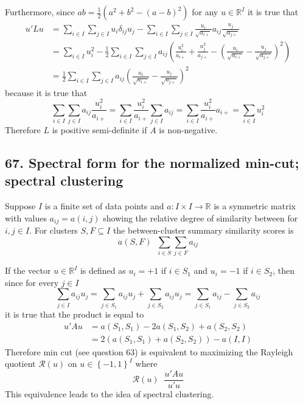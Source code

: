 \documentclass[a4paper]{article}
\newcommand{\obj}[1]{{\left\{ #1 \right \}}}
\newcommand{\brac}[1]{{\left ( #1 \right )}}
\newcommand{\Real}{\mathbb{R}}
\newcommand{\defn}{\mathop{\overset{\Delta}{=}}\nolimits}
\begin{document}
Furthermore, since $ab = \tfrac{1}{2}\brac{a^2 + b^2 - \brac{a-b}^2}$ for any $u\in \Real^I$ it is true that \begin{align*}
	u'Lu &= \sum_{i\in I} \sum_{j\in I} u_i \delta_{ij} u_j - \sum_{i\in I} \sum_{j\in I} \frac{u_i}{\sqrt{a_{i+}}} a_{ij} \frac{u_j}{\sqrt{a_{j+}}} \\ &= \sum_{i\in I} u_i^2 - \frac{1}{2} \sum_{i\in I} \sum_{j\in I} a_{ij} \brac{ \frac{u_i^2}{a_{i+}} + \frac{u_j^2}{a_{j+}} - \brac{\frac{u_i}{\sqrt{a_{i+}}} - \frac{u_j}{\sqrt{a_{j+}}} }^2 }\\ &= \frac{1}{2} \sum_{i\in I} \sum_{j\in I} a_{ij} \brac{\frac{u_i}{\sqrt{a_{i+}}} - \frac{u_j}{\sqrt{a_{j+}}} }^2 
\end{align*}
because it is true that \[\sum_{i\in I} \sum_{j\in I} a_{ij} \frac{u_i^2}{a_{i+}} = \sum_{i\in I} \frac{u_i^2}{a_{i+}} \sum_{j\in I} a_{ij} = \sum_{i\in I} \frac{u_i^2}{a_{i+}} a_{i+} = \sum_{i\in I} u_i^2\] Therefore $L$ is positive semi-definite if $A$ is non-negative.



\subsection*{67. Spectral form for the normalized min-cut; spectral clustering} %
\label{sub:question_67}
Suppose $I$ is a finite set of data points and $a:I\times I \to \Real$ is a symmetric matrix with values $a_{ij} = a(i,j)$ showing the relative degree of similarity between for $i,j\in I$. For clusters $S,F\subseteq I$ the between-cluster summary similarity scores is \[a(S,F)\defn \sum_{i\in S}\sum_{j\in F} a_{ij}\]

If the vector $u\in\Real^I$ is defined as $u_i = +1$ if $i\in S_1$ and $u_i = -1$ if $i\in S_2$, then since for every $j\in I$ \[\sum_{j\in I} a_{ij} u_j = \sum_{j\in S_1} a_{ij} u_j + \sum_{j\in S_2} a_{ij} u_j = \sum_{j\in S_1} a_{ij} - \sum_{j\in S_2} a_{ij}\] it is true that the product is equal to\begin{align*}
	u'Au &= a(S_1,S_1) - 2 a(S_1,S_2) + a(S_2,S_2) \\ &= 2\brac{ a(S_1,S_1) + a(S_2,S_2)} - a(I,I)
\end{align*}
Therefore min cut (see question 63) is equivalent to maximizing the Rayleigh quotient $\mathcal{R}(u)$ on $u\in\obj{-1,1}^I$ where \[\mathcal{R}(u)\defn \frac{u'Au}{u'u}\] This equivalence leads to the idea of spectral clustering.
\end{document}
